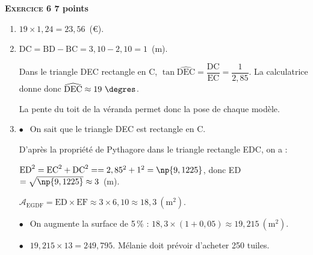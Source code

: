 \textbf{\textsc{Exercice 6} \hfill 7 points}

\medskip

\begin{enumerate}
\item $19 \times 1,24 = 23,56$~(\euro).
\item $\text{DC} = \text{BD} - \text{BC} = 3,10 - 2,10 = 1$~(m).

Dans le triangle DEC rectangle en C, $\tan \widehat{\text{DEC}} = \dfrac{\text{DC}}{\text{EC}} = \dfrac{1}{2,85}$.  La calculatrice donne donc $\widehat{\text{DEC}} \approx 19~\degres$.

La pente du toit de la véranda permet donc la pose de chaque modèle.

\item $\bullet~~$ On sait que le triangle DEC est rectangle en C.

D'après la propriété de Pythagore dans le triangle rectangle EDC, on a : 

$\text{ED}^2 = \text{EC}^2 + \text{DC}^2 = = 2,85^2 + 1^2 = \np{9,1225}$, 
donc ED $= \sqrt{\np{9,1225}} \approx 3$~(m).

$\mathcal{A}_{\text{EGDF}} = \text{ED} \times \text{EF}\approx  3 \times  6,10 \approx  18,3~\left(\text{m}^2\right)$.

$\bullet~~$ On augmente la surface de 5\,\% : $18,3 \times  (1 + 0,05) \approx 19,215~\left(\text{m}^2\right)$.

$\bullet~~$ $19,215 \times  13 = 249,795$. Mélanie doit prévoir d'acheter 250 tuiles.
\end{enumerate}

\vspace{0,5cm}

